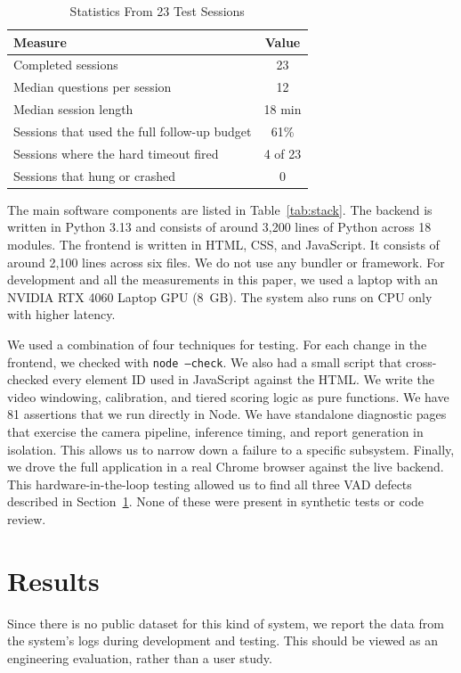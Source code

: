 \documentclass[conference]{IEEEtran}
\begin{document}
\begin{table}[t]
\caption{Statistics From 23 Test Sessions}
\label{tab:stats}
\centering
\footnotesize
\renewcommand{\arraystretch}{1.3}
\begin{tabular}{|l|c|}
\hline
\textbf{Measure} & \textbf{Value} \\
\hline
Completed sessions & 23 \\
Median questions per session & 12 \\
Median session length & 18 min \\
Sessions that used the full follow-up budget & 61\% \\
Sessions where the hard timeout fired & 4 of 23 \\
Sessions that hung or crashed & 0 \\
\hline
\end{tabular}
\end{table}

The main software components are listed in Table~\ref{tab:stack}. The backend is written in Python 3.13 and consists of around 3,200 lines of Python across 18 modules. The frontend is written in HTML, CSS, and JavaScript. It consists of around 2,100 lines across six files. We do not use any bundler or framework. For development and all the measurements in this paper, we used a laptop with an NVIDIA RTX 4060 Laptop GPU (8~GB). The system also runs on CPU only with higher latency.

We used a combination of four techniques for testing. For each change in the frontend, we checked with \texttt{node --check}. We also had a small script that cross-checked every element ID used in JavaScript against the HTML. We write the video windowing, calibration, and tiered scoring logic as pure functions. We have 81 assertions that we run directly in Node. We have standalone diagnostic pages that exercise the camera pipeline, inference timing, and report generation in isolation. This allows us to narrow down a failure to a specific subsystem. Finally, we drove the full application in a real Chrome browser against the live backend. This hardware-in-the-loop testing allowed us to find all three VAD defects described in Section~\ref{sec:results}. None of these were present in synthetic tests or code review.

\section{Results}\label{sec:results}
Since there is no public dataset for this kind of system, we report the data from the system's logs during development and testing. This should be viewed as an engineering evaluation, rather than a user study.
\end{document}
